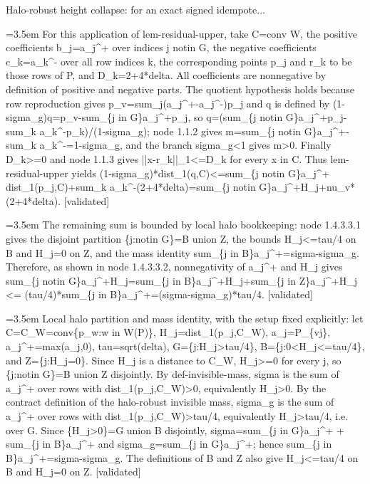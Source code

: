 \documentclass{article}
\newcommand{\step}[1]{\par\noindent\hangindent=3.5em\hangafter=1%
  \makebox[3.5em][l]{\textbf{#1.}}}
\newcommand{\steptag}[1]{\hfill{\small\textsf{[#1]}}}
\begin{document}
\begin{proofbox}{Halo-robust height collapse: for an exact signed idempote...}
\step{1.4.3.2} For this application of lem-residual-upper, take C=conv W, the positive coefficients b\_j=a\_j\textasciicircum{}+ over indices j notin G, the negative coefficients c\_k=a\_k\textasciicircum{}- over all row indices k, the corresponding points p\_j and r\_k to be those rows of P, and D\_k=2+4*delta. All coefficients are nonnegative by definition of positive and negative parts. The quotient hypothesis holds because row reproduction gives p\_v=sum\_j(a\_j\textasciicircum{}+-a\_j\textasciicircum{}-)p\_j and q is defined by (1-sigma\_g)q=p\_v-sum\_\{j in G\}a\_j\textasciicircum{}+p\_j, so q=(sum\_\{j notin G\}a\_j\textasciicircum{}+p\_j-sum\_k a\_k\textasciicircum{}-p\_k)/(1-sigma\_g); node 1.1.2 gives m=sum\_\{j notin G\}a\_j\textasciicircum{}+-sum\_k a\_k\textasciicircum{}-=1-sigma\_g, and the branch sigma\_g<1 gives m>0. Finally D\_k>=0 and node 1.1.3 gives ||x-r\_k||\_1<=D\_k for every x in C. Thus lem-residual-upper yields (1-sigma\_g)*dist\_1(q,C)<=sum\_\{j notin G\}a\_j\textasciicircum{}+ dist\_1(p\_j,C)+sum\_k a\_k\textasciicircum{}-(2+4*delta)=sum\_\{j notin G\}a\_j\textasciicircum{}+H\_j+nu\_v*(2+4*delta). \steptag{validated} \\[4pt]
\step{1.4.3.3} The remaining sum is bounded by local halo bookkeeping: node 1.4.3.3.1 gives the disjoint partition \{j:notin G\}=B union Z, the bounds H\_j<=tau/4 on B and H\_j=0 on Z, and the mass identity sum\_\{j in B\}a\_j\textasciicircum{}+=sigma-sigma\_g. Therefore, as shown in node 1.4.3.3.2, nonnegativity of a\_j\textasciicircum{}+ and H\_j gives sum\_\{j notin G\}a\_j\textasciicircum{}+H\_j=sum\_\{j in B\}a\_j\textasciicircum{}+H\_j+sum\_\{j in Z\}a\_j\textasciicircum{}+H\_j <= (tau/4)*sum\_\{j in B\}a\_j\textasciicircum{}+=(sigma-sigma\_g)*tau/4. \steptag{validated} \\[6pt]
\step{1.4.3.3.1} Local halo partition and mass identity, with the setup fixed explicitly: let C=C\_W=conv\{p\_w:w in W(P)\}, H\_j=dist\_1(p\_j,C\_W), a\_j=P\_\{vj\}, a\_j\textasciicircum{}+=max(a\_j,0), tau=sqrt(delta), G=\{j:H\_j>tau/4\}, B=\{j:0<H\_j<=tau/4\}, and Z=\{j:H\_j=0\}. Since H\_j is a distance to C\_W, H\_j>=0 for every j, so \{j:notin G\}=B union Z disjointly. By def-invisible-mass, sigma is the sum of a\_j\textasciicircum{}+ over rows with dist\_1(p\_j,C\_W)>0, equivalently H\_j>0. By the contract definition of the halo-robust invisible mass, sigma\_g is the sum of a\_j\textasciicircum{}+ over rows with dist\_1(p\_j,C\_W)>tau/4, equivalently H\_j>tau/4, i.e. over G. Since \{H\_j>0\}=G union B disjointly, sigma=sum\_\{j in G\}a\_j\textasciicircum{}+ + sum\_\{j in B\}a\_j\textasciicircum{}+ and sigma\_g=sum\_\{j in G\}a\_j\textasciicircum{}+; hence sum\_\{j in B\}a\_j\textasciicircum{}+=sigma-sigma\_g. The definitions of B and Z also give H\_j<=tau/4 on B and H\_j=0 on Z. \steptag{validated} \\[6pt]

\end{proofbox}
\end{document}
